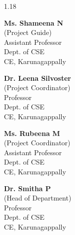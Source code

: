 \begin{spacing}{1.18}
\begin{center}
\begin{minipage}[t]{0.25\textwidth}
\centering
{\bfseries Ms. Shameena N} \\
(Project Guide) \\
Assistant Professor \\
Dept. of CSE \\
CE, Karunagappally
\end{minipage}\hfill
\begin{minipage}[t]{0.25\textwidth}
\centering
{\bfseries Dr. Leena Silvoster} \\
(Project Coordinator) \\
Professor \\
Dept. of CSE \\
CE, Karunagappally
\end{minipage}
\hfill
\begin{minipage}[t]{0.25\textwidth}
\centering
{\bfseries Ms. Rubeena M} \\
(Project Coordinator) \\
Assistant Professor \\
Dept. of CSE \\
CE, Karunagappally
\end{minipage}

\vspace{1.0cm}

{\bfseries Dr. Smitha P} \\
(Head of Department) \\
Professor \\
Dept. of CSE \\
CE, Karunagappally
\end{center}

\end{spacing}

\thispagestyle{empty}
\endgroup
